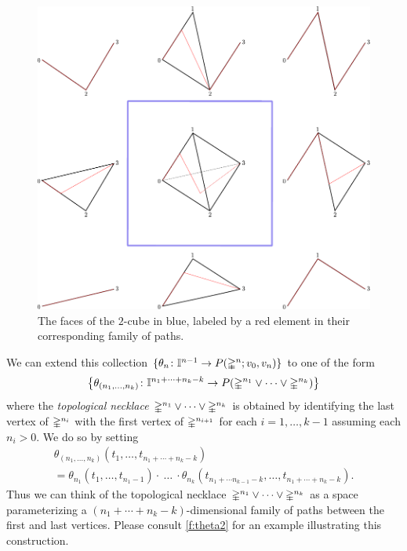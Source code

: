 \begin{figure}[b]
	\centering
	\includegraphics[scale=.5]{aux/theta3.pdf}
	\caption{The faces of the $2$-cube in blue, labeled by a red element in their corresponding family of paths.}
	\label{f:theta3}
\end{figure}

We can extend this collection $\{\theta_n \colon \gcube^{n-1} \to P(\gsimplex^n;v_0,v_n)\}$ to one of the form
\[
\set[\big]{\theta_{(n_1, \dots, n_k)} \colon \gcube^{n_1 + \dots + n_k-k} \to P(\gsimplex^{n_1} \vee \cdots \vee \gsimplex^{n_k})}
\]
where the \textit{topological necklace} $\gsimplex^{n_1} \vee \cdots \vee \gsimplex^{n_k}$ is obtained by identifying the last vertex of $\gsimplex^{n_i}$ with the first vertex of $\gsimplex^{n_{i+1}}$ for each $i = 1, \dots, k-1$ assuming each $n_i > 0$.
We do so by setting
\begin{multline*}
	\theta_{(n_1, \ldots, n_k)}(t_1, \ldots, t_{n_1+ \cdots + n_k-k}) \\ =
	\theta_{n_1}(t_1, \ldots, t_{n_1-1}) \cdot\ \dots\ \cdot \theta_{n_k}(t_{n_1+ \cdots n_{k-1}-k},\ldots,t_{n_1 + \cdots +n_k-k}).
\end{multline*}
Thus we can think of the topological necklace $\gsimplex^{n_1} \vee \cdots \vee \gsimplex^{n_k}$ as a space parameterizing a $(n_1+ \cdots + n_k-k)$-dimensional family of paths between the first and last vertices.
Please consult \cref{f:theta2} for an example illustrating this construction.

